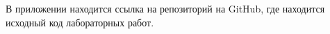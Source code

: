 
В приложении находится ссылка на репозиторий на GitHub, где находится исходный код лабораторных работ.
	
